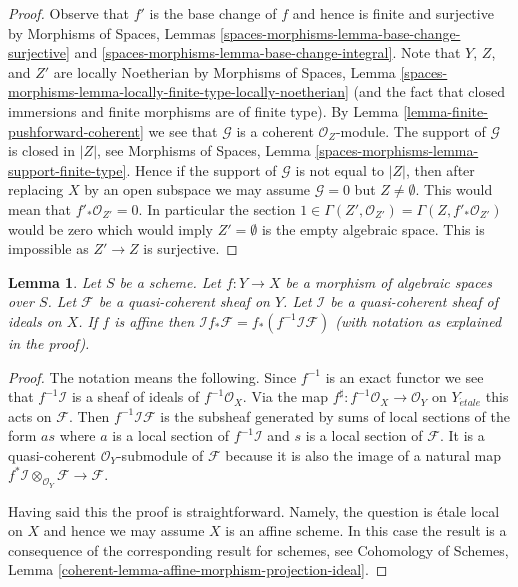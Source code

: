 \documentclass{stacks-project}
\theoremstyle{plain}
\newtheorem{lemma}[subsection]{Lemma}
\theoremstyle{definition}
\theoremstyle{remark}
\numberwithin{equation}{subsection}
\def\etale{{\acute{e}tale}}
\begin{document}
\begin{proof}
Observe that $f'$ is the base change of $f$ and hence is finite
and surjective by Morphisms of Spaces, Lemmas
\ref{spaces-morphisms-lemma-base-change-surjective} and
\ref{spaces-morphisms-lemma-base-change-integral}.
Note that $Y$, $Z$, and $Z'$ are locally Noetherian by
Morphisms of Spaces, Lemma
\ref{spaces-morphisms-lemma-locally-finite-type-locally-noetherian}
(and the fact that closed immersions and finite morphisms
are of finite type). By Lemma \ref{lemma-finite-pushforward-coherent}
we see that $\mathcal{G}$ is a coherent $\mathcal{O}_Z$-module.
The support of $\mathcal{G}$ is closed in $|Z|$, see
Morphisms of Spaces, Lemma
\ref{spaces-morphisms-lemma-support-finite-type}.
Hence if the support of $\mathcal{G}$ is not equal to $|Z|$,
then after replacing $X$ by an open subspace we may assume
$\mathcal{G} = 0$ but $Z \not = \emptyset$.
This would mean that $f'_*\mathcal{O}_{Z'} = 0$. In particular the section
$1 \in \Gamma(Z', \mathcal{O}_{Z'}) = \Gamma(Z, f'_*\mathcal{O}_{Z'})$
would be zero which would imply $Z' = \emptyset$ is the empty
algebraic space. This is impossible as $Z' \to Z$ is surjective.
\end{proof}

\begin{lemma}
\label{lemma-affine-morphism-projection-ideal}
Let $S$ be a scheme. Let $f : Y \to X$ be a morphism of algebraic spaces
over $S$. Let $\mathcal{F}$ be a quasi-coherent sheaf on $Y$.
Let $\mathcal{I}$ be a quasi-coherent sheaf of ideals on $X$.
If $f$ is affine then
$\mathcal{I}f_*\mathcal{F} = f_*(f^{-1}\mathcal{I}\mathcal{F})$
(with notation as explained in the proof).
\end{lemma}

\begin{proof}
The notation means the following. Since $f^{-1}$ is an exact functor
we see that $f^{-1}\mathcal{I}$ is a sheaf
of ideals of $f^{-1}\mathcal{O}_X$. Via the map
$f^\sharp : f^{-1}\mathcal{O}_X \to \mathcal{O}_Y$
on $Y_\etale$ this acts on $\mathcal{F}$.
Then $f^{-1}\mathcal{I}\mathcal{F}$ is the subsheaf
generated by sums of local sections of the form $as$ where $a$
is a local section of $f^{-1}\mathcal{I}$ and $s$ is a local section
of $\mathcal{F}$. It is a quasi-coherent $\mathcal{O}_Y$-submodule
of $\mathcal{F}$ because it is also the image of a natural map
$f^*\mathcal{I} \otimes_{\mathcal{O}_Y} \mathcal{F} \to \mathcal{F}$.

\medskip\noindent
Having said this the proof is straightforward. Namely, the question is
\'etale local on $X$ and hence we may assume $X$ is an affine scheme.
In this case the result is a consequence of the corresponding result
for schemes, see Cohomology of Schemes, Lemma
\ref{coherent-lemma-affine-morphism-projection-ideal}.
\end{proof}
\end{document}
